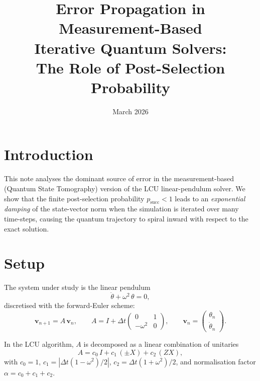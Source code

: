\documentclass[11pt,a4paper]{article}
\title{Error Propagation in Measurement-Based\\
       Iterative Quantum Solvers:\\
       The Role of Post-Selection Probability}
\author{}
\date{March 2026}
\begin{document}
\maketitle

\section{Introduction}

This note analyses the dominant source of error in the measurement-based
(Quantum State Tomography) version of the LCU linear-pendulum solver.
We show that the finite post-selection probability \(p_{\text{succ}} < 1\)
leads to an \emph{exponential damping} of the state-vector norm when the
simulation is iterated over many time-steps, causing the quantum
trajectory to spiral inward with respect to the exact solution.

\section{Setup}

The system under study is the linear pendulum
\begin{equation}\label{eq:ode}
  \ddot\theta + \omega^2\,\theta = 0,
\end{equation}
discretised with the forward-Euler scheme:
\begin{equation}
  \mathbf v_{n+1}
  = A\,\mathbf v_n, \qquad
  A = I + \Delta t\begin{pmatrix} 0 & 1 \\ -\omega^2 & 0 \end{pmatrix},
  \qquad
  \mathbf v_n = \begin{pmatrix} \theta_n \\ \dot\theta_n \end{pmatrix}.
\end{equation}

In the LCU algorithm, \(A\) is decomposed as a linear combination of
unitaries
\begin{equation}
  A = c_0\,I + c_1\,(\pm X) + c_2\,(ZX),
\end{equation}
with \(c_0=1\), \(c_1=|\Delta t(1-\omega^2)/2|\),
\(c_2=\Delta t(1+\omega^2)/2\), and normalisation factor
\(\alpha = c_0+c_1+c_2\).
\end{document}
